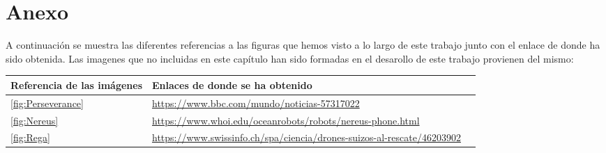 \chapter{Anexo}
\label{cap:anexo}
\setcounter{page}{1}
A continuación se muestra las diferentes referencias a las figuras que hemos visto a lo largo de este trabajo junto con el enlace 
de donde ha sido obtenida. Las imagenes que no incluidas en este capítulo han sido formadas en el desarollo de este trabajo provienen 
del mismo: \newline

\begin{tabular}{ | m{4cm} | m{10cm}| m{1cm} | }
    \hline
    \textbf{Referencia de las imágenes} & \textbf{Enlaces de donde se ha obtenido}  \\
    \hline
    \ref{fig:Perseverance} & \url{https://www.bbc.com/mundo/noticias-57317022} \\ 
    \hline
    \ref{fig:Nereus} & \url{https://www.whoi.edu/oceanrobots/robots/nereus-phone.html} \\ 
    \hline
    \ref{fig:Rega} & \url{https://www.swissinfo.ch/spa/ciencia/drones-suizos-al-rescate/46203902} \\
    \hline 
\end{tabular}

